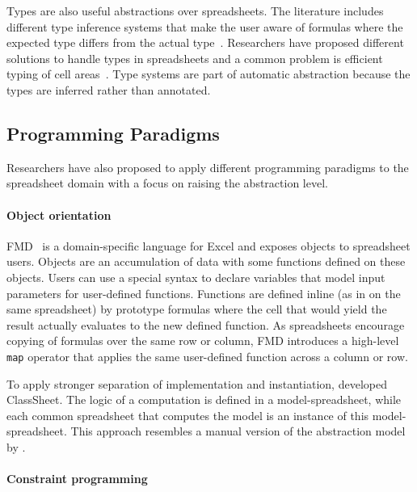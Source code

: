 \documentclass[a4paper]{article}
\begin{document}
Types are also useful abstractions over spreadsheets. The literature
includes different type inference systems that make the user aware of
formulas where the expected type differs from the actual
type~\cite{Abraham:2006:TIS:1140335.1140346,
  Cheng2015Static}. Researchers have proposed different solutions to
handle types in spreadsheets and a common problem is efficient typing
of cell areas~\cite{Abraham:2006:TIS:1140335.1140346,
  Cheng2012Abstract}. Type systems are part of automatic abstraction
because the types are inferred rather than annotated.

\subsection{Programming Paradigms}
\label{sec:progr-parad}

Researchers have also proposed to apply different programming
paradigms to the spreadsheet domain with a focus on raising the
abstraction level.

\paragraph{Object orientation}

FMD~\cite{Benfield:2009:FFD:1668113.1668121} is a domain-specific
language for Excel and exposes objects to spreadsheet users. Objects
are an accumulation of data with some functions defined on these
objects. Users can use a special syntax to declare variables that
model input parameters for user-defined functions. Functions are
defined inline (as in on the same spreadsheet) by prototype formulas
where the cell that would yield the result actually evaluates to the
new defined function. As spreadsheets encourage copying of formulas
over the same row or column, FMD introduces a high-level \texttt{map}
operator that applies the same user-defined function across a column
or row.

To apply stronger separation of implementation and instantiation,
\citet{6070409} developed ClassSheet. The logic of a computation is
defined in a model-spreadsheet, while each common spreadsheet that
computes the model is an instance of this model-spreadsheet. This
approach resembles a manual version of the abstraction model by
\citet{Isakowitz:1995:TLT:195705.195708}.

\paragraph{Constraint programming}
\end{document}
